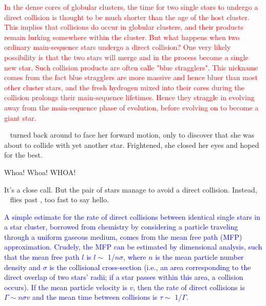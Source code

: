 \documentclass[main.tex]{subfiles}
\begin{document}
\begin{tcolorbox}[sharp corners, colback=red!30, colframe=red!80!blue, title=Stellar Collisions and Blue Stragglers]
\par \textcolor{red} {In the dense cores of globular clusters, the time for two single stars to undergo a direct collision is thought to be much shorter than the age of the host cluster.  This implies that collisions do occur in globular clusters, and their products remain lurking somewhere within the cluster.  But what happens when two ordinary main-sequence stars undergo a direct collision?  One very likely possibility is that the two stars will merge and in the process become a single new star.  Such collision products are often calle "blue stragglers".  This nickname comes from the fact blue stragglers are more massive and hence bluer than most other cluster stars, and the fresh hydrogen mixed into their cores during the collision prolongs their main-sequence lifetimes.  Hence they straggle in evolving away from the main-sequence phase of evolution, before evolving on to become a giant star.}
\end{tcolorbox} 

\par \nar \rmsterope~ turned back around to face her forward motion, only to discover that she was about to collide with yet another star.  Frightened, she closed her eyes and hoped for the best.  

\par \Louise Whoa! Whoa! WHOA!

\par \nar It's a close call.  But the pair of stars manage to avoid a direct collision.  Instead, \rmsterope~ flies past \rmlouise, too fast to say hello.

\begin{tcolorbox}[sharp corners, colback=blue!30, colframe=blue!80!blue, title=Collision Rate I]
\par \textcolor{blue}{A simple estimate for the rate of direct collisions between identical single stars in a star cluster, borrowed from chemistry by considering a particle traveling through a uniform gaseous medium, comes from the mean free path (MFP) approximation.  Crudely, the MFP can be estimated by dimensional analysis, such that the mean free path $l$ is $l \sim$ 1/$n\sigma$, where $n$ is the mean particle number density and $\sigma$ is the collisional cross-section (i.e., an area corresponding to the direct overlap of two stars' radii; if a star passes within this area, a collision occurs).  If the mean particle velocity is $v$, then the rate of direct collisions is $\Gamma \sim n\sigma{v}$ and the mean time between collisions is $\tau \sim$ 1/$\Gamma$.}  
\end{tcolorbox} 
\end{document}
